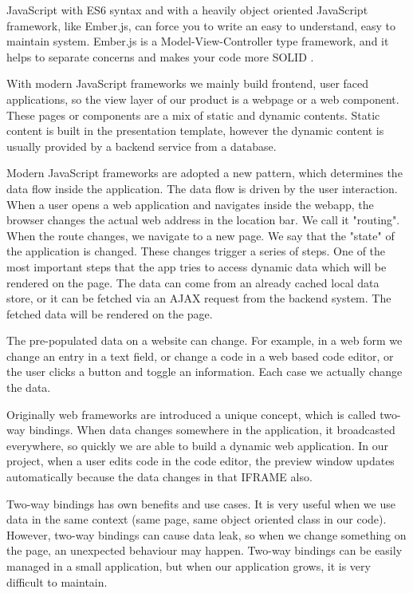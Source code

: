 \documentclass[11pt, a4paper, oneside, openright, medskipamount]{report}
\begin{document}
JavaScript with ES6 syntax and with a heavily object oriented JavaScript framework, like Ember.js, can force you to write an easy to understand, easy to maintain system. Ember.js is a Model-View-Controller type framework, and it helps to separate concerns and makes your code more SOLID \cite{solid}.

With modern JavaScript frameworks we mainly build frontend, user faced applications, so the view layer of our product is a webpage or a web component. These pages or components are a mix of static and dynamic contents. Static content is built in the presentation template, however the dynamic content is usually provided by a backend service from a database.

Modern JavaScript frameworks are adopted a new pattern, which determines the data flow inside the application. The data flow is driven by the user interaction. When a user opens a web application and navigates inside the webapp, the browser changes the actual web address in the location bar. We call it "routing". When the route changes, we navigate to a new page. We say that the "state" of the application is changed. These changes trigger a series of steps. One of the most important steps that the app tries to access dynamic data which will be rendered on the page. The data can come from an already cached local data store, or it can be fetched via an AJAX request from the backend system. The fetched data will be rendered on the page.

The pre-populated data on a website can change. For example, in a web form we change an entry in a text field, or change a code in a web based code editor, or the user clicks a button and toggle an information. Each case we actually change the data.

Originally web frameworks are introduced a unique concept, which is called two-way bindings. When data changes somewhere in the application, it broadcasted everywhere, so quickly we are able to build a dynamic web application. In our project, when a user edits code in the code editor, the preview window updates automatically because the data changes in that IFRAME also.

Two-way bindings has own benefits and use cases. It is very useful when we use data in the same context (same page, same object oriented class in our code). However, two-way bindings can cause data leak, so when we change something on the page, an unexpected behaviour may happen. Two-way bindings can be easily managed in a small application, but when our application grows, it is very difficult to maintain.
\end{document}
